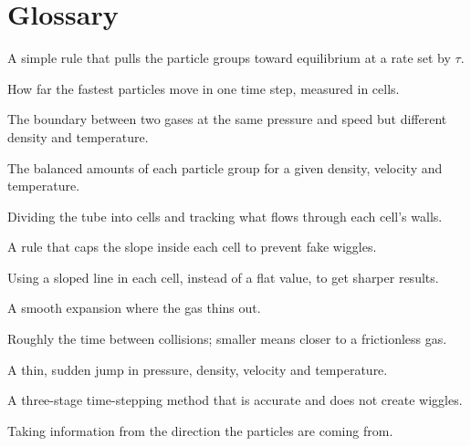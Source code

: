 \documentclass[11pt]{article}
\newcommand{\feq}{f^{\mathrm{eq}}}
\begin{document}
\section*{Glossary}
\begin{description}[leftmargin=0pt,itemsep=2pt]
  \item[BGK collision] A simple rule that pulls the particle groups toward
        equilibrium at a rate set by $\tau$.
  \item[CFL number] How far the fastest particles move in one time step, measured in
        cells.
  \item[Contact] The boundary between two gases at the same pressure and speed but
        different density and temperature.
  \item[Equilibrium ($\feq$)] The balanced amounts of each particle group for a
        given density, velocity and temperature.
  \item[Finite volume] Dividing the tube into cells and tracking what flows through
        each cell's walls.
  \item[Limiter] A rule that caps the slope inside each cell to prevent fake
        wiggles.
  \item[MUSCL] Using a sloped line in each cell, instead of a flat value, to get
        sharper results.
  \item[Rarefaction] A smooth expansion where the gas thins out.
  \item[Relaxation time ($\tau$)] Roughly the time between collisions; smaller means
        closer to a frictionless gas.
  \item[Shock] A thin, sudden jump in pressure, density, velocity and temperature.
  \item[SSP-RK3] A three-stage time-stepping method that is accurate and does not
        create wiggles.
  \item[Upwinding] Taking information from the direction the particles are coming
        from.
\end{description}
\end{document}
